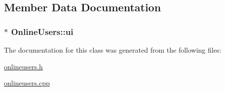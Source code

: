 \subsection{Member Data Documentation}
\hypertarget{classOnlineUsers_a65219d2514073ec680053f792b722887}{
\subsubsection[{ui}]{$\ast$ Online\-Users\-::ui\hspace{0.3cm}{\ttfamily [private]}}}\label{classOnlineUsers_a65219d2514073ec680053f792b722887}


The documentation for this class was generated from the following files\-:\begin{DoxyCompactItemize}
\item 
\hyperlink{onlineusers_8h}{onlineusers.\-h}\item 
\hyperlink{onlineusers_8cpp}{onlineusers.\-cpp}\end{DoxyCompactItemize}
